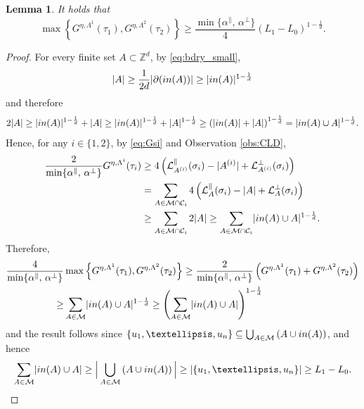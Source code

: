 \documentclass[11pt, reqno]{amsart}
\newtheorem{lemma}[theorem]{Lemma}
\numberwithin{equation}{section}
\begin{document}
\begin{lemma}\label{lem:GGLL}
It holds that
\begin{equation*}
\max\left\{G^{\eta,\Lambda^1}({\tau}_1),G^{\eta,\Lambda^2}({\tau}_2)\right\}\geq\frac{\min\{\alpha^{\parallel},\,\alpha^{\perp}\}}{4}(L_1-L_0)^{1-\frac{1}{d}}.    
\end{equation*}
\end{lemma}

\begin{proof}
For every finite set $A\subset{\mathbb Z}^d$, by \eqref{eq:bdry_small},
$$
\lvert A\rvert\geq\frac{1}{2d}\lvert \partial({\rm in}(A))\rvert\geq\lvert{\rm in}(A)\rvert^{1-\frac{1}{d}}
$$
and therefore
$$
2\lvert A\rvert\geq\lvert{\rm in}(A)\rvert^{1-\frac{1}{d}}+\lvert A\rvert\geq \lvert{\rm in}(A)\rvert^{1-\frac{1}{d}}+\lvert A\rvert^{1-\frac{1}{d}}\geq \left(\lvert{\rm in}(A)\rvert+\lvert A\rvert\right)^{1-\frac{1}{d}}=\lvert{\rm in}(A)\cup  A\rvert^{1-\frac{1}{d}}.
$$
Hence, for any $i\in\{1,2\}$, by \eqref{eq:Gsi} and Observation \ref{obs:CLD},
\begin{align*}
\frac{2}{\min\{\alpha^{\parallel},\,\alpha^{\perp}\}}G^{\eta,\Lambda^i}({\tau}_i)&\geq 4\left(\mathcal{L}^{\parallel}_{A^{(i)}}(\sigma_i)-|A^{(i)}|+\mathcal{L}^{\perp}_{A^{(i)}}(\sigma_i)\right)\\
&=\sum_{A\in\mathcal{M}\cap\mathcal{C}_i}
4\left(\mathcal{L}^{\parallel}_A(\sigma_i)-|A|+\mathcal{L}^{\perp}_A(\sigma_i)\right)\\
&\geq \sum_{A\in
\mathcal{M}\cap\mathcal{C}_i}
2\lvert A\rvert\geq \sum_{A\in
\mathcal{M}\cap\mathcal{C}_i}
\lvert{\rm in}(A)\cup  A\rvert^{1-\frac{1}{d}}.
\end{align*}
Therefore,
\begin{align*}
\frac{4}{\min\{\alpha^{\parallel},\,\alpha^{\perp}\}}&\max\left\{G^{\eta,\Lambda^1}({\tau}_1),G^{\eta,\Lambda^2}({\tau}_2)\right\}\geq\frac{2}{\min\{\alpha^{\parallel},\,\alpha^{\perp}\}}\left(G^{\eta,\Lambda^1}({\tau}_1)+G^{\eta,\Lambda^2}({\tau}_2)\right)\\
\geq& \sum_{A\in\mathcal{M}}
\lvert{\rm in}(A)\cup  A\rvert^{1-\frac{1}{d}}\geq \left(\sum_{A\in\mathcal{M}}
\lvert{\rm in}(A)\cup  A\rvert\right)^{1-\frac{1}{d}}
\end{align*}
and the result follows since $\{u_1,\ldots,u_n\}\subseteq\bigcup_{A\in
\mathcal{M}}
\left( A\cup{\rm in}(A)\right)$, and hence
\begin{equation*}
\sum_{A\in\mathcal{M}}
\lvert{\rm in}(A)\cup  A\rvert\geq\Big\lvert\bigcup_{A\in\mathcal{M}}
\left( A\cup{\rm in}(A)\right)\Big\rvert\geq \lvert\{u_1,\ldots,u_n\}\rvert\geq L_1-L_0.
\qedhere\end{equation*}
\end{proof}
\end{document}
